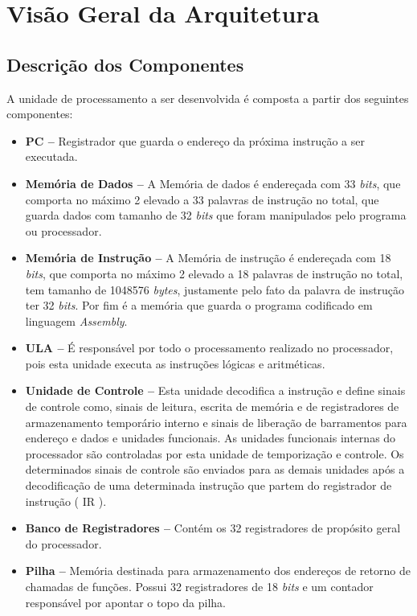 \documentclass{report}
\begin{document}
\chapter{Visão Geral da Arquitetura}
  \section{Descrição dos Componentes}
  A unidade de processamento a ser desenvolvida é composta a partir dos seguintes componentes:
  
  \begin{itemize}
    \item \textbf{PC --} Registrador que guarda o endereço da próxima instrução a ser executada.
    
    \item \textbf{Memória de Dados --} A Memória de dados é endereçada com 33 \textit{bits}, que comporta no máximo 2 elevado a 33 palavras de instrução no total, que guarda dados com tamanho de 32 \textit{bits} que foram manipulados pelo programa ou processador. 
   
    \item \textbf{Memória de Instrução --} A Memória de instrução é endereçada com 18 \textit{bits}, que comporta no máximo 2 elevado a 18 palavras de instrução no total, tem tamanho de 1048576 \textit{bytes}, justamente pelo fato da palavra de instrução ter 32 \textit{bits}. Por fim é a memória que guarda o programa codificado em linguagem \textit{Assembly}.
    
    \item \textbf{ULA --} É responsável por todo o processamento realizado no processador, pois esta unidade executa as instruções lógicas e aritméticas.
    
    \item \textbf{Unidade de Controle --} Esta unidade decodifica a instrução e define sinais de controle como, sinais de leitura, escrita de memória e de registradores de armazenamento temporário interno e sinais de liberação de barramentos para endereço e dados e unidades funcionais. As unidades funcionais internas do processador são controladas por esta unidade de temporização e controle. Os determinados sinais de controle são enviados para as demais unidades após a decodificação de uma determinada instrução que partem do registrador de instrução ( IR ).
    
    \item \textbf{Banco de Registradores --} Contém os 32 registradores de propósito geral do processador.
    
    \item \textbf{Pilha --} Memória destinada para armazenamento dos endereços de retorno de chamadas de funções. Possui 32 registradores de 18 \textit{bits} e um contador responsável por apontar o topo da pilha.
  \end{itemize}
  
\end{document}
